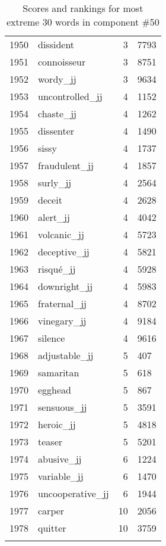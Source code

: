 \begin{longtable}[!htbp]{| rlr@{.}l |}
    1950 & dissident & 3 & 7793 \\
    1951 & connoisseur & 3 & 8751 \\
    1952 & wordy\_jj & 3 & 9634 \\
    1953 & uncontrolled\_jj & 4 & 1152 \\
    1954 & chaste\_jj & 4 & 1262 \\
    1955 & dissenter & 4 & 1490 \\
    1956 & sissy & 4 & 1737 \\
    1957 & fraudulent\_jj & 4 & 1857 \\
    1958 & surly\_jj & 4 & 2564 \\
    1959 & deceit & 4 & 2628 \\
    1960 & alert\_jj & 4 & 4042 \\
    1961 & volcanic\_jj & 4 & 5723 \\
    1962 & deceptive\_jj & 4 & 5821 \\
    1963 & risqué\_jj & 4 & 5928 \\
    1964 & downright\_jj & 4 & 5983 \\
    1965 & fraternal\_jj & 4 & 8702 \\
    1966 & vinegary\_jj & 4 & 9184 \\
    1967 & silence & 4 & 9616 \\
    1968 & adjustable\_jj & 5 & 407 \\
    1969 & samaritan & 5 & 618 \\
    1970 & egghead & 5 & 867 \\
    1971 & sensuous\_jj & 5 & 3591 \\
    1972 & heroic\_jj & 5 & 4818 \\
    1973 & teaser & 5 & 5201 \\
    1974 & abusive\_jj & 6 & 1224 \\
    1975 & variable\_jj & 6 & 1470 \\
    1976 & uncooperative\_jj & 6 & 1944 \\
    1977 & carper & 10 & 2056 \\
    1978 & quitter & 10 & 3759 \\
    \hline
    \caption{Scores and rankings for most extreme 30 words in component \#50} \\
\end{longtable}

